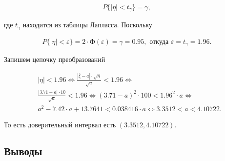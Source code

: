 \documentclass[14pt,a4paper]{scrartcl}
\theoremstyle{definition}
\theoremstyle{remark}
\theoremstyle{definition}
\theoremstyle{definition}
\begin{document}
\begin{align*}
  P\{|\eta| < t_{\gamma}\} = \gamma,
\end{align*}

где $t_{\gamma}$ находится из таблицы Лапласса. Поскольку

\begin{align*}
  P\{|\eta| < \varepsilon\} = 2 \cdot \text{Ф}(\varepsilon) = \gamma = 0.95, \text{ откуда } \varepsilon = t_{\gamma} = 1.96.
\end{align*}

Запишем цепочку преобразований

\begin{align*}
  &|\eta| < 1.96 \iff \frac{|\overline{\xi}-a|\cdot \sqrt{n}}{\sqrt{a}} < 1.96 \iff \\
  &\frac{|3.71-a|\cdot 10}{\sqrt{a}} < 1.96 \iff (3.71-a)^2 \cdot 100 < 1.96^2 \cdot a \iff \\
  &a^2-7.42\cdot a + 13.7641 < 0.038416\cdot a \iff 3.3512 < a < 4.10722.
\end{align*}

То есть доверительный интервал есть $(3.3512, 4.10722).$

\subsection{Выводы}
\end{document}
